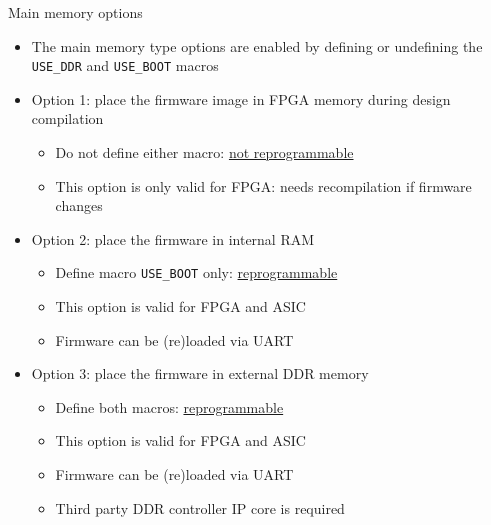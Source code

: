 \documentclass [xcolor=svgnames, t] {beamer}
\begin{document}
\begin{frame}{Main memory options}
\begin{itemize}
\item The main memory type options are enabled by defining or undefining the {\tt USE\_DDR} and {\tt USE\_BOOT} macros
\item Option 1: place the firmware image in FPGA memory during design compilation
  \begin{itemize}
  \item Do not define either macro: \underline{not reprogrammable}
  \item This option is only valid for FPGA: needs recompilation if firmware changes
  \end{itemize}
\item Option 2: place the firmware in internal RAM
  \begin{itemize}
  \item Define macro {\tt USE\_BOOT} only: \underline {reprogrammable}
  \item This option is valid for FPGA and ASIC
  \item Firmware can be (re)loaded via UART
  \end{itemize}
\item Option 3: place the firmware in external DDR memory
  \begin{itemize}
  \item Define both macros: \underline{reprogrammable}
  \item This option is valid for FPGA and ASIC
  \item Firmware can be (re)loaded via UART
  \item Third party DDR controller IP core is required
  \end{itemize}
\end{itemize}
\end{frame}
\end{document}
